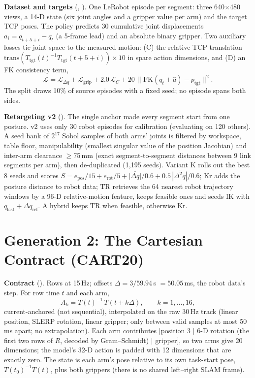 \documentclass[conference,10pt]{IEEEtran}
\newcommand{\mm}{\,mm\xspace}
\begin{document}
\textbf{Dataset and targets} (, ). One LeRobot episode per segment: three
640$\times$480 views, a 14-D state (six joint angles and a gripper value per arm) and the target TCP poses. The policy predicts 30
cumulative joint displacements $a_i=q_{t+5+i}-q_t$ (a 5-frame lead) and an absolute binary gripper. Two auxiliary losses tie joint
space to the measured motion: (C) the relative TCP translation $\mathrm{trans}(T_\text{tgt}(t)^{-1}T_\text{tgt}(t{+}5{+}i))\times10$
in spare action dimensions, and (D) an FK consistency term,
\begin{equation}
\mathcal{L}=\mathcal{L}_{\Delta q}+\mathcal{L}_\text{grip}+2.0\,\mathcal{L}_C+20\,\lVert \mathrm{FK}(q_t+\hat a)-p_\text{tgt}\rVert^2 .
\end{equation}
The split draws 10\% of source episodes with a fixed seed; no episode spans both sides.

\textbf{Retargeting v2} (). The single anchor made every segment start from one posture. v2 uses only
30 robot episodes for calibration (evaluating on 120 others). A seed bank of $2^{17}$ Sobol samples of both arms' joints is filtered
by workspace, table floor, manipulability (smallest singular value of the position Jacobian) and inter-arm clearance $\ge$75\mm{}
(exact segment-to-segment distances between 9 link segments per arm), then de-duplicated (1{,}195 seeds). Variant K rolls out the
best 8 seeds and scores $S=\overline{e_\text{pos}}/15+\overline{e_\text{rot}}/5+\overline{|\Delta q|}/0.6+0.5\,\overline{|\Delta^2q|}/0.6$;
Kr adds the posture distance to robot data; TR retrieves the 64 nearest robot trajectory windows by a 96-D relative-motion
feature, keeps feasible ones and seeds IK with $q_\text{last}+\Delta q_\text{ref}$. A hybrid keeps TR when feasible, otherwise Kr.

\section{Generation 2: The Cartesian Contract (CART20)}\label{sec:gen2}
\textbf{Contract} (). Rows at 15\,Hz; offsets $\Delta=3/59.94$\,s $=50.05$\,ms, the robot data's
step. For row time $t$ and each arm,
\begin{equation}
A_k = T(t)^{-1}\,T(t+k\Delta),\qquad k=1,\dots,16 ,
\end{equation}
current-anchored (not sequential), interpolated on the raw 30\,Hz track (linear position, SLERP rotation, linear gripper; only
between valid samples at most 50\,ms apart; no extrapolation). Each arm contributes [position 3 $\mid$ 6-D rotation (the first two
rows of $R$, decoded by Gram--Schmidt) $\mid$ gripper], so two arms give 20 dimensions; the model's 32-D action is padded with 12
dimensions that are exactly zero. The state is each arm's pose relative to its own task-start pose, $T(t_0)^{-1}T(t)$, plus both
grippers (there is no shared left--right SLAM frame).
\end{document}
